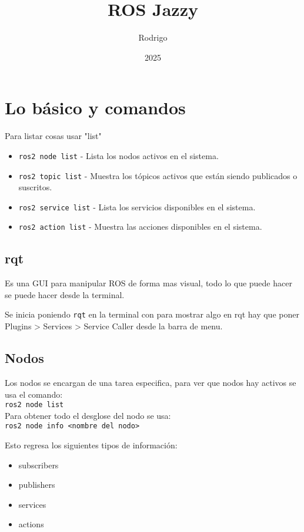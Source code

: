 \documentclass{report}
\author{Rodrigo}
\title{ROS Jazzy}
\date{2025}
\begin{document}
\maketitle
\tableofcontents
\chapter{Lo básico y comandos}
Para listar cosas usar "list"
\begin{itemize}
    \item \texttt{ros2 node list} - Lista los nodos activos en el sistema.
    \item \texttt{ros2 topic list} - Muestra los tópicos activos que están siendo publicados o suscritos.
    \item \texttt{ros2 service list} - Lista los servicios disponibles en el sistema.
    \item \texttt{ros2 action list} - Muestra las acciones disponibles en el sistema.
\end{itemize}

\section{rqt}
Es una GUI para manipular ROS de forma mas visual, todo lo que puede hacer se puede hacer desde la 
terminal.

Se inicia poniendo \texttt{rqt} en la terminal con  para mostrar algo en rqt hay que poner
Plugins > Services > Service Caller desde la barra de menu.

\section{Nodos}
Los nodos se encargan de una tarea especifica, para ver que nodos hay activos se usa el comando:
\\\texttt{ros2 node list}
\\Para obtener todo el desglose del nodo se usa:
\\\texttt{ros2 node info <nombre del nodo>}

Esto regresa los siguientes tipos de información:
\begin{itemize}
    \item subscribers
    \item publishers
    \item services
    \item actions
\end{itemize}
\end{document}
